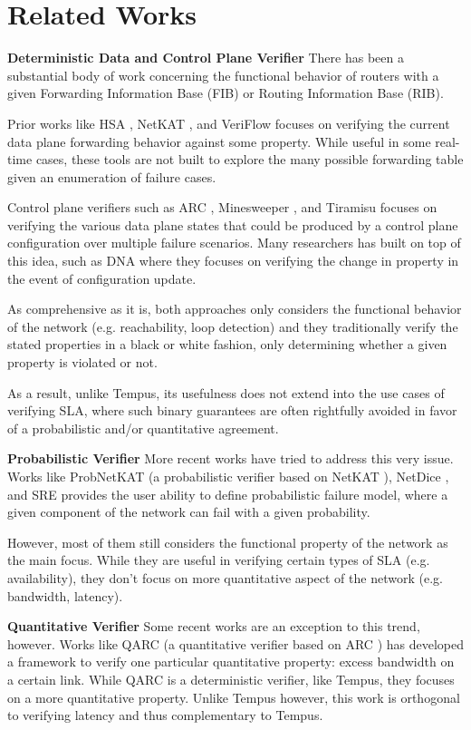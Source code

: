 \section{Related Works} \label{sec:rel}
\textbf{Deterministic Data and Control Plane Verifier}
There has been a substantial body of work concerning the functional behavior of routers
with a given Forwarding Information Base (FIB) or Routing Information Base (RIB).

Prior works like HSA \cite{hsa}, NetKAT \cite{netkat}, and VeriFlow \cite{veriflow} focuses on verifying the 
current data plane forwarding behavior against some property.
While useful in some real-time cases, these tools are not built to explore the many
possible forwarding table given an enumeration of failure cases.

Control plane verifiers such as ARC \cite{arc}, Minesweeper \cite{minesweeper}, and 
Tiramisu \cite{tiramisu} focuses on verifying the various data plane states that 
could be produced by a control plane configuration over multiple failure scenarios.
Many researchers has built on top of this idea, such as DNA \cite{dna} where they 
focuses on verifying the change in property in the event of configuration update.

As comprehensive as it is, both approaches only considers the functional behavior 
of the network (e.g. reachability, loop detection) and they traditionally verify 
the stated properties in a black or white fashion, only determining whether a given 
property is violated or not.

As a result, unlike Tempus, its usefulness does not extend into the use cases of 
verifying SLA, where such binary guarantees are often rightfully avoided in favor 
of a probabilistic and/or quantitative agreement.

\textbf{Probabilistic Verifier}
More recent works have tried to address this very issue.
Works like ProbNetKAT \cite{probnetkat} (a probabilistic verifier based on NetKAT 
\cite{netkat}), NetDice \cite{netdice}, and SRE \cite{sre} provides 
the user ability to define probabilistic failure model, where a given component 
of the network can fail with a given probability.

However, most of them still considers the functional property of the network as the 
main focus. 
While they are useful in verifying certain types of SLA (e.g. availability), they don't 
focus on more quantitative aspect of the network (e.g. bandwidth, latency).

\textbf{Quantitative Verifier}
Some recent works are an exception to this trend, however.
Works like QARC \cite{qarc} (a quantitative verifier based on 
ARC \cite{arc}) has developed a framework to verify one particular quantitative 
property: excess bandwidth on a certain link.
While QARC is a deterministic verifier, like Tempus, they focuses on a more quantitative 
property. 
Unlike Tempus however, this work is orthogonal to verifying latency and thus complementary 
to Tempus.


